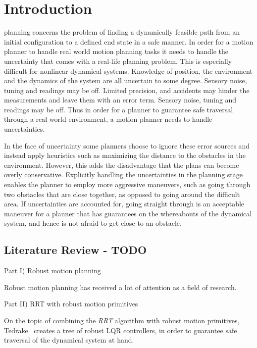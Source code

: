 
\section{Introduction}
 planning concerns the problem of finding a dynamically
feasible path from an initial configuration to a defined end state in a safe
manner. In order for a motion planner to handle real world motion planning tasks
it needs to handle the uncertainty that comes with a real-life planning problem.
This is especially difficult for nonlinear dynamical systems. Knowledge of
position, the environment and the dynamics of the system are all uncertain to
some degree. Sensory noise, tuning and readings may be off. Limited precision,
and accidents may hinder the measurements and leave them with an error term.
Sensory noise, tuning and readings may be off. Thus in order for a planner to
guarantee safe traversal through a real world environment, a motion planner
needs to handle uncertainties.

In the face of uncertainty some planners choose to ignore these error sources
and instead apply heuristics such as maximizing the distance to the obstacles in
the environment. However, this adds the disadvantage that the plans can become
overly conservative. Explicitly handling the uncertainties in the planning stage
enables the planner to employ more aggressive maneuvers, such as going through
two obstacles that are close together, as opposed to going around the difficult
area. If uncertainties are accounted for, going straight through is an
acceptable maneuver for a planner that has guarantees on the whereabouts of the
dynamical system, and hence is not afraid to get close to an obstacle.

\subsection{Literature Review - TODO}

Part I) Robust motion planning

Robust motion planning has received a lot of attention as a field of research.

Part II) RRT with robust motion primitives

On the topic of combining the \textit{RRT} algorithm with robust motion
primitives, Tedrake~\cite{tedrakeLQRtreesFeedbackMotion2009} creates a tree of
robust LQR controllers, in order to guarantee safe traversal of the dynamical
system at hand.

